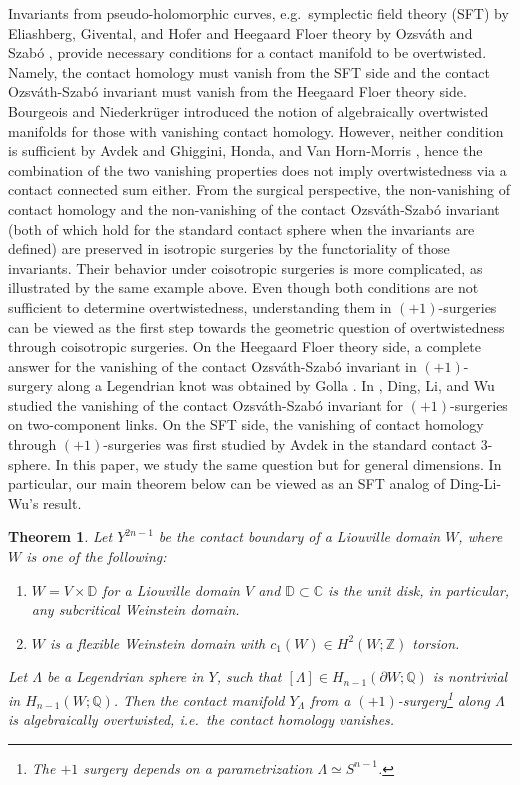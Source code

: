 \documentclass[reqno,11pt]{amsart}
\numberwithin{equation}{section}
\newtheorem{theorem}{\textbf{Theorem}}[section]
\def\Z{{\mathbb Z}}
\def\C{{\mathbb C}}
\def\D{{\mathbb D}}
\def\Q{{\mathbb Q}}
\begin{document}
Invariants from pseudo-holomorphic curves, e.g.\ symplectic field theory (SFT) by Eliashberg, Givental, and Hofer \cite{zbMATH01643843} and Heegaard Floer theory by Ozsv\'ath and Szab\'o  \cite{zbMATH02144173}, provide necessary conditions for a contact manifold to be overtwisted. Namely, the contact homology must vanish \cite{zbMATH05709738} from the SFT side and the contact Ozsv\'ath-Szab\'o invariant must vanish \cite{zbMATH02207895} from the Heegaard Floer theory side. Bourgeois and Niederkr{\"u}ger \cite{zbMATH05658836} introduced the notion of algebraically overtwisted manifolds for those with vanishing contact homology. However, neither condition is sufficient by Avdek \cite{avdek2020combinatorial} and Ghiggini, Honda, and Van Horn-Morris \cite{ghiggini2007vanishing}, hence the combination of the two vanishing properties does not imply overtwistedness via a contact connected sum either. From the surgical perspective, the non-vanishing of contact homology and the non-vanishing of the contact Ozsv\'ath-Szab\'o invariant (both of which hold for the standard contact sphere when the invariants are defined) are preserved in isotropic surgeries by the functoriality of those invariants. Their behavior under coisotropic surgeries is more complicated, as illustrated by the same example above. Even though both conditions are not sufficient to determine overtwistedness, understanding them in $(+1)$-surgeries can be viewed as the first step towards the geometric question of overtwistedness through coisotropic surgeries. On the Heegaard Floer theory side, a complete answer for the vanishing of the contact Ozsv\'ath-Szab\'o invariant in $(+1)$-surgery along a Legendrian knot was obtained by Golla \cite{zbMATH06413573}. In \cite{DLW}, Ding, Li, and Wu studied the vanishing of the contact Ozsv\'ath-Szab\'o invariant for $(+1)$-surgeries on two-component links. On the SFT side, the vanishing of contact homology through $(+1)$-surgeries was first studied by Avdek \cite{avdek2020combinatorial} in the standard contact $3$-sphere. In this paper, we study the same question but for general dimensions. In particular, our main theorem below can be viewed as an SFT analog of Ding-Li-Wu's result.
\begin{theorem}\label{thm:main}
    Let $Y^{2n-1}$ be the contact boundary of a Liouville domain $W$, where $W$ is one of the following:
    \begin{enumerate}
        \item $W=V\times \D$ for a Liouville domain $V$ and $\D\subset \C$ is the unit disk, in particular, any subcritical Weinstein domain.
        \item $W$ is a flexible Weinstein domain \cite{zbMATH06054083} with $c_1(W)\in H^2(W;\Z)$ torsion.
    \end{enumerate}
    Let  $\Lambda$ be a Legendrian sphere in $Y$, such that $[\Lambda]\in H_{n-1}(\partial W;\Q)$ is nontrivial in $H_{n-1}(W;\Q)$.   Then the contact manifold $Y_{\Lambda}$ from a $(+1)$-surgery\footnote{The $+1$ surgery depends on a parametrization $\Lambda\simeq S^{n-1}$.} along $\Lambda$ is algebraically overtwisted, i.e.\ the contact homology vanishes.
\end{theorem}
\end{document}
